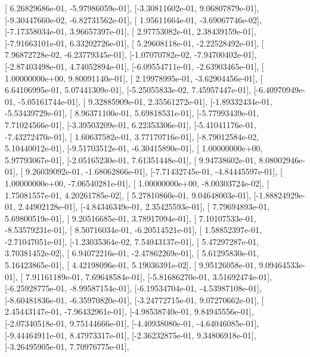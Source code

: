 \documentclass{article}
\begin{document}
       [ 6.26829686e-01, -5.97986059e-01],
       [-3.30811602e-01,  9.06807879e-01],
       [-9.30447660e-02, -6.82731562e-01],
       [ 1.95611664e-01, -3.69067746e-02],
       [-7.17358034e-01,  3.96657397e-01],
       [ 2.97753082e-01,  2.38439159e-01],
       [-7.91663101e-01,  6.33202726e-01],
       [ 5.29608118e-01, -2.22528492e-01],
       [ 7.96872728e-02, -6.23779345e-01],
       [-1.07070782e-02, -7.94700402e-01],
       [-2.87403498e-01,  4.74052894e-01],
       [-6.09554711e-01, -2.63903465e-01],
       [ 1.00000000e+00,  9.80091140e-01],
       [ 2.19978995e-01, -3.62904456e-01],
       [ 6.64106995e-01,  5.07441309e-01],
       [-5.25055833e-02,  7.45957447e-01],
       [-6.40970949e-01, -5.05161744e-01],
       [ 9.32885909e-01,  2.35561272e-01],
       [-1.89332434e-01, -5.53439729e-01],
       [ 8.96371100e-01,  5.69818531e-01],
       [-5.77993439e-01,  7.71024566e-01],
       [-3.39503209e-01,  6.22353306e-01],
       [-5.41041176e-01, -7.43272470e-01],
       [ 1.60637582e-01,  3.77170716e-01],
       [-8.79012584e-02,  5.10440012e-01],
       [-9.51703512e-01, -6.30415890e-01],
       [ 1.00000000e+00,  5.97793067e-01],
       [-2.05165230e-01,  7.61351448e-01],
       [ 9.94738602e-01,  8.08002946e-01],
       [ 9.26039092e-01, -1.68062866e-01],
       [-7.71432745e-01, -4.84445597e-01],
       [ 1.00000000e+00, -7.06540281e-01],
       [ 1.00000000e+00, -8.00303724e-02],
       [ 1.75081557e-01,  4.20261785e-02],
       [ 5.27810860e-01,  9.04648003e-01],
       [-1.88824929e-01,  2.44902128e-01],
       [-4.84346349e-01,  2.35425593e-01],
       [ 7.79694893e-01,  5.69800519e-01],
       [ 9.20516685e-01,  3.78917094e-01],
       [ 7.10107533e-01, -8.53579231e-01],
       [ 8.50716034e-01, -6.20514521e-01],
       [ 1.58852397e-01, -2.71047051e-01],
       [-1.23035364e-02,  7.54043137e-01],
       [ 5.47297287e-01,  3.70381452e-02],
       [ 6.94072216e-01, -2.47862269e-01],
       [ 5.61295830e-01,  5.16423865e-01],
       [ 4.42198096e-01,  5.19036391e-02],
       [ 9.95126058e-01,  9.09464533e-01],
       [ 7.91161189e-01,  7.69648584e-01],
       [-5.81686270e-01,  3.51692474e-01],
       [-6.25928775e-01, -8.99587154e-01],
       [-6.19534704e-01, -4.53987108e-01],
       [-8.60481836e-01, -6.35970820e-01],
       [-3.24772715e-01,  9.07270662e-01],
       [ 2.45443147e-01, -7.96432961e-01],
       [-4.98538740e-01,  9.84945556e-01],
       [-2.07340518e-01,  9.75144666e-01],
       [-4.40938080e-01, -4.64046085e-01],
       [-9.44464911e-01,  8.47973317e-01],
       [-2.36232875e-01,  9.34806918e-01],
       [-3.26495905e-01,  7.70976775e-01],
\end{document}
